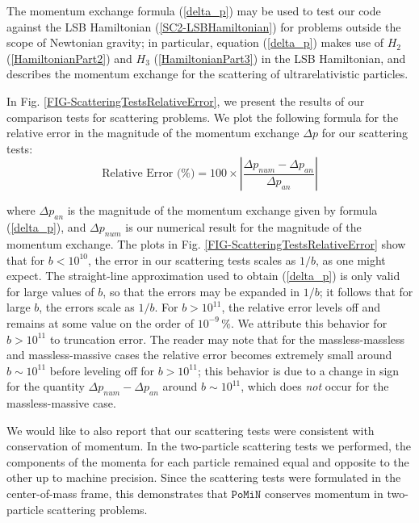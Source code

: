 \documentclass[aps,onecolumn,notitlepage,eqsecnum,nofootinbib,floatfix,superscriptaddress]{revtex4-1}
\newcommand{\codename}{\mathtt{PoMiN}}
\begin{document}
The momentum exchange formula (\ref{delta_p}) may be used to test our code against the LSB Hamiltonian (\ref{SC2-LSBHamiltonian}) for problems outside the scope of Newtonian gravity; in particular, equation (\ref{delta_p}) makes use of $H_2$ (\ref{HamiltonianPart2}) and $H_3$ (\ref{HamiltonianPart3}) in the LSB Hamiltonian, and describes the momentum exchange for the scattering of ultrarelativistic particles.

In Fig. \ref{FIG-ScatteringTestsRelativeError}, we present the results of our comparison tests for scattering problems. We plot the following formula for the relative error in the magnitude of the momentum exchange $\Delta p$ for our scattering tests:
\begin{equation} \label{relerror}
\text{Relative Error (\%)} = 100 \times \left| \frac{\Delta p_{num} - \Delta p_{an}}{\Delta p_{an}} \right|
\end{equation}

\noindent where $\Delta p_{an}$ is the magnitude of the momentum exchange given by formula (\ref{delta_p}), and $\Delta p_{num}$ is our numerical result for the magnitude of the momentum exchange. The plots in Fig. \ref{FIG-ScatteringTestsRelativeError} show that for $b<10^{10}$, the error in our scattering tests scales as $1/b$, as one might expect. The straight-line approximation used to obtain (\ref{delta_p}) is only valid for large values of $b$, so that the errors may be expanded in $1/b$; it follows that for large $b$, the errors scale as $1/b$. For $b>10^{11}$, the relative error levels off and remains at some value on the order of $10^{-9} \, \%$. We attribute this behavior for $b>10^{11}$ to truncation error. The reader may note that for the massless-massless and massless-massive cases the relative error becomes extremely small around $b \sim 10^{11}$ before leveling off for $b>10^{11}$; this behavior is due to a change in sign for the quantity $\Delta p_{num} - \Delta p_{an}$ around $b \sim 10^{11}$, which does \textit{not} occur for the massless-massive case.

We would like to also report that our scattering tests were consistent with conservation of momentum. In the two-particle scattering tests we performed, the components of the momenta for each particle remained equal and opposite to the other up to machine precision. Since the scattering tests were formulated in the center-of-mass frame, this demonstrates that $\codename$ conserves momentum in two-particle scattering problems.

\end{document}
